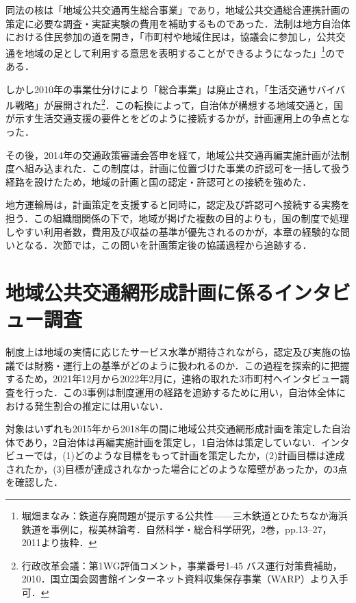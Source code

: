 同法の核は「地域公共交通再生総合事業」であり，地域公共交通総合連携計画の策定に必要な調査・実証実験の費用を補助するものであった．法制は地方自治体における住民参加の道を開き，「市町村や地域住民は，協議会に参加し，公共交通を地域の足として利用する意思を表明することができるようになった」\footnote{堀畑まなみ：鉄道存廃問題が提示する公共性——三木鉄道とひたちなか海浜鉄道を事例に，桜美林論考．自然科学・総合科学研究，2巻，pp.13--27，2011より抜粋．}のである．

しかし2010年の事業仕分けにより「総合事業」は廃止され\cite{genki2010}，「生活交通サバイバル戦略」が展開された\footnote{行政改革会議：第1WG評価コメント，事業番号1-45 バス運行対策費補助，2010．国立国会図書館インターネット資料収集保存事業（WARP）より入手可．}．この転換によって，自治体が構想する地域交通と，国が示す生活交通支援の要件とをどのように接続するかが，計画運用上の争点となった．

その後，2014年の交通政策審議会答申\cite{kotsuseisaku2014}を経て，地域公共交通再編実施計画が法制度へ組み込まれた．この制度は，計画に位置づけた事業の許認可を一括して扱う経路を設けたため，地域の計画と国の認定・許認可との接続を強めた．

地方運輸局は，計画策定を支援すると同時に，認定及び許認可へ接続する実務を担う．この組織間関係の下で，地域が掲げた複数の目的よりも，国の制度で処理しやすい利用者数，費用及び収益の基準が優先されるのかが，本章の経験的な問いとなる．次節では，この問いを計画策定後の協議過程から追跡する．

\section{地域公共交通網形成計画に係るインタビュー調査}
\label{sec:ch5_interview}

制度上は地域の実情に応じたサービス水準が期待されながら，認定及び実施の協議では財務・運行上の基準がどのように扱われるのか．この過程を探索的に把握するため，2021年12月から2022年2月に，連絡の取れた3市町村へインタビュー調査を行った．この3事例は制度運用の経路を追跡するために用い，自治体全体における発生割合の推定には用いない．

対象はいずれも2015年から2018年の間に地域公共交通網形成計画を策定した自治体であり，2自治体は再編実施計画を策定し，1自治体は策定していない．インタビューでは，(1)どのような目標をもって計画を策定したか，(2)計画目標は達成されたか，(3)目標が達成されなかった場合にどのような障壁があったか，の3点を確認した．

